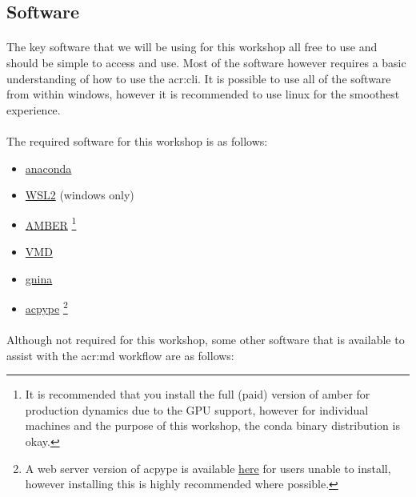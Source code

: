 \subsection{Software}
    \paragraph{}
    The key software that we will be using for this workshop all free to use and should be simple to access and use. Most of the software however requires a basic understanding of how to use the \gls{acr:cli}. It is possible to use all of the software from within windows, however it is recommended to use linux for the smoothest experience. 

    \paragraph{}
    The required software for this workshop is as follows:
\begin{itemize}
    \item \href{https://www.anaconda.com/download/}{anaconda}
    \item \href{https://learn.microsoft.com/en-us/windows/wsl/install}{WSL2} (windows only)
    \item \href{https://ambermd.org/GetAmber.php}{AMBER}\cite{Maier2015Ff14SB:Ff99SB} \footnote{It is recommended that you install the full (paid) version of amber for production dynamics due to the GPU support, however for individual machines and the purpose of this workshop, the conda binary distribution is okay.}
    \item \href{https://www.ks.uiuc.edu/Development/Download/download.cgi?PackageName=VMD}{VMD}\cite{WilliamHumphrey1996VMDDynamics}
    \item \href{https://github.com/gnina/gnina}{gnina}\cite{McNutt2021GNINALearning}
    \item \href{https://pypi.org/project/acpype/}{acpype} \cite{SousadaSilva2012ACPYPEInterfacE} \footnote{A web server version of acpype is available \href{https://www.bio2byte.be/acpype/submit/}{here} for users unable to install, however installing this is highly recommended where possible.}
\end{itemize}

    \paragraph{}
    Although not required for this workshop, some other software that is available to assist with the \gls{acr:md} workflow are as follows:


